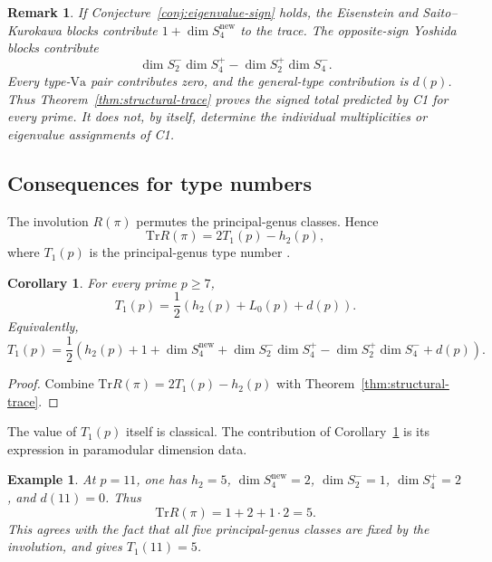 \documentclass[10pt,a4paper]{amsart}
\newtheorem{corollary}[theorem]{Corollary}
\newtheorem{remark}[theorem]{Remark}
\newtheorem{example}[theorem]{Example}
\newcommand{\Tr}{\mathrm{Tr}}
\newcommand{\Va}{\mathrm{Va}}
\newcommand{\snew}{S^{\mathrm{new}}}
\providecommand{\Va}{\mathrm{Va}}
\providecommand{\snew}{S^{\mathrm{new}}}
\begin{document}
	\begin{remark}	\label{rem:trace-consistency}
		If Conjecture~\ref{conj:eigenvalue-sign} holds, the Eisenstein and
		Saito--Kurokawa blocks contribute $1+\dim\snew_4$ to the trace. The
		opposite-sign Yoshida blocks contribute
		\[
		\dim S_2^-\dim S_4^+-\dim S_2^+\dim S_4^-.
		\]
		Every type-$\Va$ pair contributes zero, and the general-type contribution
		is $d(p)$. Thus Theorem~\ref{thm:structural-trace} proves the signed total
		predicted by C1 for every prime. It does not, by itself, determine the
		individual multiplicities or eigenvalue assignments of C1.
	\end{remark}
	
	\subsection{Consequences for type numbers}
	\label{ss:type-number-trace}
	
	The involution $R(\pi)$ permutes the principal-genus classes. Hence
	\[
	\Tr R(\pi)=2T_1(p)-h_2(p),
	\]
	where $T_1(p)$ is the principal-genus type number
	\cite{IbukiyamaKatsura,Ibukiyama2018type}.
	
	\begin{corollary}\label{cor:typenum}
		For every prime $p\ge7$,
		\begin{equation}\label{eq:type-number-paramodular}
			T_1(p)=\frac12\left(h_2(p)+L_0(p)+d(p)\right).
		\end{equation}
		Equivalently,
		\[
		T_1(p)=\frac12\left(
		h_2(p)+1+\dim\snew_4
		+\dim S_2^-\dim S_4^+
		-\dim S_2^+\dim S_4^-
		+d(p)
		\right).
		\]
	\end{corollary}
	
	\begin{proof}
		Combine $\Tr R(\pi)=2T_1(p)-h_2(p)$ with
		Theorem~\ref{thm:structural-trace}.
	\end{proof}
	
	The value of $T_1(p)$ itself is classical. The contribution of
	Corollary~\ref{cor:typenum} is its expression in paramodular dimension data.
	
	\begin{example}\label{ex:trace-p11}
		At $p=11$, one has $h_2=5$, $\dim\snew_4=2$,
		$\dim S_2^-=1$, $\dim S_4^+=2$, and $d(11)=0$. Thus
		\[
		\Tr R(\pi)=1+2+1\cdot2=5.
		\]
		This agrees with the fact that all five principal-genus classes are fixed
		by the involution, and gives $T_1(11)=5$.
	\end{example}
	
\end{document}

